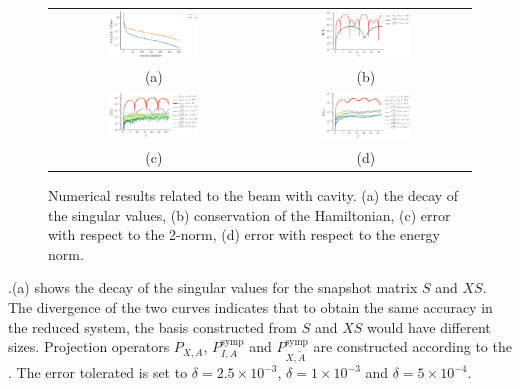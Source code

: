 \begin{figure} 
\begin{tabular}{cc}
\includegraphics[width=0.45\textwidth]{./images/paper2/beam_cracked/singulars} & \includegraphics[width=0.45\textwidth]{./images/paper2/beam_cracked/energy} \\
(a) & (b) \\
\includegraphics[width=0.45\textwidth]{./images/paper2/beam_cracked/l2} & \includegraphics[width=0.45\textwidth]{./images/paper2/beam_cracked/energy_norm} \\
(c) & (d) \\
\end{tabular}
\caption{Numerical results related to the beam with cavity. (a) the decay of the singular values, (b) conservation of the Hamiltonian, (c) error with respect to the 2-norm, (d) error with respect to the energy norm.} \label{fig:1.1}
\end{figure}

.(a) shows the decay of the singular values for the snapshot matrix $S$ and $XS$. The divergence of the two curves indicates that to obtain the same accuracy in the reduced system, the basis constructed from $S$ and $XS$ would have different sizes.
Projection operators $P_{X,A}$, $P_{I,A}^{\text{symp}}$ and $P_{X,\tilde A}^{\text{symp}}$ are constructed according to the . The error tolerated is set to $\delta = 2.5\times 10^{-3}$, 
$\delta = 1\times 10^{-3}$ and $\delta = 5\times 10^{-4}$.

